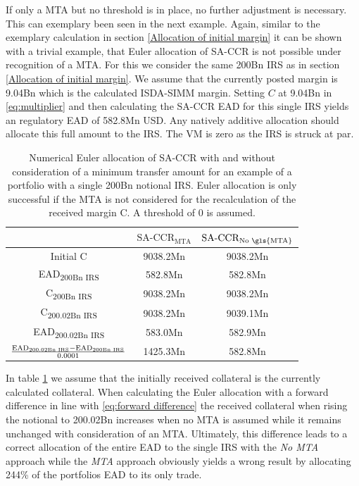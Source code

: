 \documentclass[../Thesis_AHoecherl.tex]{subfiles}
\begin{document}
    If only a MTA but no threshold is in place, no further adjustment is necessary.
    This can exemplary been seen in the next example.
    Again, similar to the exemplary calculation in section \ref{Allocation of initial margin} it can be shown with a trivial example, that Euler allocation of SA-CCR is not possible under recognition of a \gls{MTA}. 
    For this we consider the same 200Bn \gls{IRS} as in section \ref{Allocation of initial margin}. We assume that the currently posted margin is 9.04Bn which is the calculated ISDA-SIMM margin. 
    Setting $C$ at 9.04Bn in \ref{eq:multiplier} and then calculating the SA-CCR EAD for this single IRS  yields an regulatory EAD of 582.8Mn USD. Any natively additive allocation should allocate this full amount to the IRS.
    The \gls{VM} is zero as the IRS is struck at par.
    \begin{table}[htbp]
        \label{tab:Allocate SA-CCR with MTA calculation}
        \centering
            \begin{tabular}{c|c|c}
                & $\text{SA-CCR}_{\text{MTA}}$ & $\text{SA-CCR}_{\text{No \gls{MTA}}}$ \\
                \toprule
                Initial C & 9038.2Mn & 9038.2Mn \\
                \midrule
                EAD\textsubscript{200Bn IRS} & 582.8Mn & 582.8Mn \\
                \midrule
                C\textsubscript{200Bn IRS} & 9038.2Mn & 9038.2Mn \\
                \midrule
                C\textsubscript{200.02Bn IRS} & 9038.2Mn & 9039.1Mn \\
                \midrule
                EAD\textsubscript{200.02Bn IRS} & 583.0Mn & 582.9Mn \\
                \midrule
                $\frac{\text{EAD\textsubscript{200.02Bn IRS}}-\text{EAD\textsubscript{200Bn IRS}}}{0.0001}$ & 1425.3Mn & 582.8Mn  \\
            \end{tabular}%
        \caption{Numerical Euler allocation of SA-CCR with and without consideration of a minimum transfer amount for an example of a portfolio with a single 200Bn notional IRS. Euler allocation is only successful if the \gls{MTA} is not considered for the recalculation of the received margin C. A threshold of 0 is assumed.}
    \end{table}
    In table \ref{tab:Allocate SA-CCR with MTA calculation} we assume that the initially received collateral is the currently calculated collateral. 
    When calculating the Euler allocation with a forward difference in line with \ref{eq:forward difference} the received collateral when rising the notional to 200.02Bn increases when no MTA is assumed while it remains unchanged with consideration of an MTA. 
    Ultimately, this difference leads to a correct allocation of the entire EAD to the single IRS with the \emph{No MTA} approach while the \emph{MTA} approach obviously yields a wrong result by allocating 244\% of the portfolios EAD to its only trade.
\end{document}

